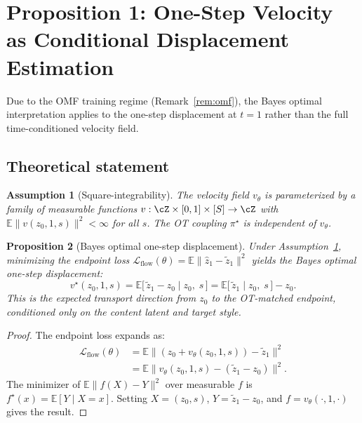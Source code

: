 \documentclass[letterpaper]{article}
\newtheorem{proposition}{Proposition}[section]
\newtheorem{assumption}[proposition]{Assumption}
\newcommand{\E}{\mathbb{E}}
\newcommand{\cL}{\mathcal{L}}
\begin{document}
\section{Proposition 1: One-Step Velocity as Conditional Displacement Estimation}

Due to the OMF training regime (Remark~\ref{rem:omf}), the Bayes optimal
interpretation applies to the one-step displacement at $t=1$ rather than
the full time-conditioned velocity field.

\subsection{Theoretical statement}

\begin{assumption}[Square-integrability]
\label{asm:sqint}
The velocity field $v_\theta$ is parameterized by a family of measurable
functions $v:\cZ\times[0,1]\times[S]\to\cZ$ with
$\E\|v(z_0,1,s)\|^2<\infty$ for all $s$.
The OT coupling $\pi^\star$ is independent of $v_\theta$.
\end{assumption}

\begin{proposition}[Bayes optimal one-step displacement]
\label{prop:bayes_omf}
Under Assumption~\ref{asm:sqint}, minimizing the endpoint loss
$\cL_{\text{flow}}(\theta)=\E\|\hat z_1 - \tilde z_1\|^2$ yields the
Bayes optimal one-step displacement:
\begin{equation}
    v^\star(z_0, 1, s) = \E\bigl[\,\tilde z_1 - z_0 \mid z_0,\; s \,\bigr]
    = \E\bigl[\,\tilde z_1 \mid z_0,\; s \,\bigr] - z_0.
    \label{eq:bayes_omf}
\end{equation}
This is the expected transport direction from $z_0$ to the OT-matched
endpoint, conditioned only on the content latent and target style.
\end{proposition}

\begin{proof}
The endpoint loss expands as:
\begin{align}
    \cL_{\text{flow}}(\theta)
    &= \E\bigl\| (z_0 + v_\theta(z_0,1,s)) - \tilde z_1 \bigr\|^2 \\
    &= \E\bigl\| v_\theta(z_0,1,s) - (\tilde z_1 - z_0) \bigr\|^2.
\end{align}
The minimizer of $\E\|f(X)-Y\|^2$ over measurable $f$ is
$f^\star(x)=\E[Y\mid X=x]$. Setting $X=(z_0,s)$, $Y=\tilde z_1-z_0$,
and $f=v_\theta(\cdot,1,\cdot)$ gives the result.
\end{proof}
\end{document}
